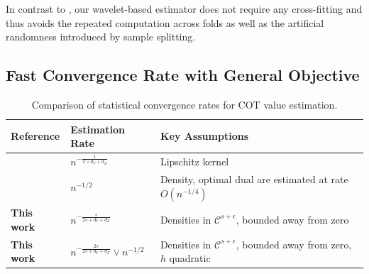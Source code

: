 \documentclass{article}
\theoremstyle{plain}
\theoremstyle{definition}
\theoremstyle{plain}
\begin{document}
In contrast to \parencite{ji2023model}, our wavelet-based estimator does not require any cross-fitting and thus avoids the repeated computation across folds as well as the artificial randomness introduced by sample splitting.

\subsection{Fast Convergence Rate with General Objective}

\begin{table}[tbp]
\centering
\caption{Comparison of statistical convergence rates for COT value estimation.}
\label{tab:cot_rates}
\begin{tabular}{lll}
\toprule
\textbf{Reference} & \textbf{Estimation Rate} & \textbf{Key Assumptions} \\
\midrule
\parencite{lin2025estimation} 
& $n^{-\frac{1}{2 \vee d_Y + d_Z}}$ 
& Lipschitz kernel \\

\parencite{ji2023model} 
& $n^{-1/2}$ 
& Density, optimal dual are estimated at rate $O(n^{-1/4})$\\

\textbf{This work}
& $n^{-\frac{s}{2s+d_Y+d_Z}}$ 
& Densities in $\mathcal C^{s+\epsilon}$, bounded away from zero  \\
\textbf{This work}
& $n^{-\frac{2s}{2s+d_Y+d_Z}} \vee n^{-1/2}$ 
& Densities in $\mathcal C^{s+\epsilon}$, bounded away from zero, $h$ quadratic\\
\bottomrule
\end{tabular}\label{tab:compare_rate}
\end{table}
\end{document}
